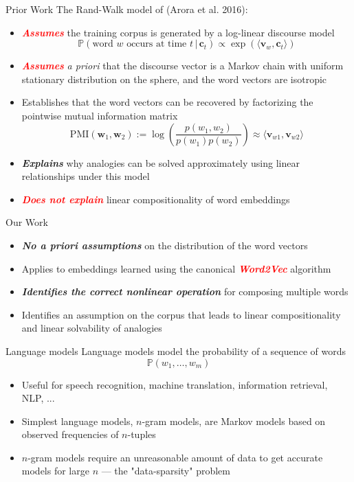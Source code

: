 \documentclass[xcolor=x11names,compress,ignorenonframetext,10pt]{beamer}
\renewcommand{\(}{\begin{columns}}
\renewcommand{\)}{\end{columns}}
\newcommand{\<}[1]{\begin{column}{#1}}
\renewcommand{\>}{\end{column}}
\def\refcolor{DodgerBlue4}
\newcommand{\refer}[1]{({\color{\refcolor}#1})}
\newcommand{\redemphasis}[1]{\textbf{\textit{\textcolor{red}{#1}}}}
\newcommand{\greenemphasis}[1]{\textbf{\textit{\textcolor{dgreen}{#1}}}}
\begin{document}
\begin{frame}{Prior Work}
The Rand-Walk model of \refer{Arora et al. 2016}:
\begin{itemize}
  \item \redemphasis{Assumes} the training corpus is generated by a log-linear discourse model
\[
\mathbb{P}(\text{word $w$ occurs at time $t$}\,|\,\mathbf{c}_t) \propto \exp(\langle \mathbf{v}_w, \mathbf{c}_t\rangle )
\]
 \item \redemphasis{Assumes} \emph{a priori} that the discourse vector is a Markov chain with uniform
stationary distribution on the sphere, and the word vectors are isotropic
 \item Establishes that the word vectors can be recovered by factorizing the pointwise mutual information matrix
\[
  \textrm{PMI}(\mathbf{w}_1, \mathbf{w}_2) := \log\left( \frac{p(w_1, w_2)}{p(w_1)p(w_2)} \right) \approx \langle \mathbf{v}_{w1}, \mathbf{v}_{w2} \rangle
\]
\item \greenemphasis{Explains} why analogies can be solved approximately using linear relationships under this model
\item \redemphasis{Does not explain} linear compositionality of word embeddings
\end{itemize}
\end{frame}

\begin{frame}{Our Work}
\begin{itemize}
  \item \greenemphasis{No \emph{a priori} assumptions} on the distribution of the word vectors
  \item Applies to embeddings learned using the canonical \redemphasis{Word2Vec} algorithm
  \item \greenemphasis{Identifies the correct nonlinear operation} for composing multiple words
  \item Identifies an assumption on the corpus that leads to linear 
compositionality and linear solvability of analogies
\end{itemize}
\end{frame}

\begin{frame}{Language models}
Language models model the probability of a sequence of words
\[
\mathbb{P}(w_1, \ldots, w_m)
\]
\begin{itemize}
  \item Useful for speech recognition, machine translation, information retrieval, NLP, ...
  \item Simplest language models, $n$-gram models, are Markov models based on observed frequencies of $n$-tuples
  \item $n$-gram models require an unreasonable amount of data to get accurate models for large $n$ --- the "data-sparsity" problem
\end{itemize}
\end{frame}
\end{document}
